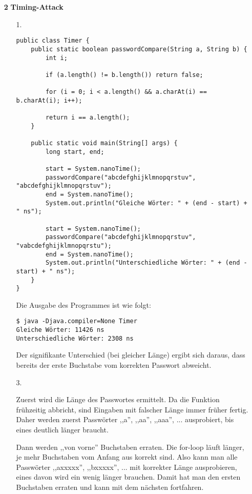 \documentclass[a4paper,11pt]{article}
\begin{document}
\begin{enumerate}
\item[\textbf{2}]
    \textbf{Timing-Attack}

    \begin{enumerate}
        \item[1.]
            \begin{verbatim}public class Timer {
    public static boolean passwordCompare(String a, String b) {
        int i;

        if (a.length() != b.length()) return false;

        for (i = 0; i < a.length() && a.charAt(i) == b.charAt(i); i++);

        return i == a.length();
    }

    public static void main(String[] args) {
        long start, end;

        start = System.nanoTime();
        passwordCompare("abcdefghijklmnopqrstuv", "abcdefghijklmnopqrstuv");
        end = System.nanoTime();
        System.out.println("Gleiche Wörter: " + (end - start) + " ns");

        start = System.nanoTime();
        passwordCompare("abcdefghijklmnopqrstuv", "vabcdefghijklmnopqrstu");
        end = System.nanoTime();
        System.out.println("Unterschiedliche Wörter: " + (end - start) + " ns");
    }
}\end{verbatim}

            Die Ausgabe des Programmes ist wie folgt:

            \begin{verbatim}$ java -Djava.compiler=None Timer
Gleiche Wörter: 11426 ns
Unterschiedliche Wörter: 2308 ns\end{verbatim}

            Der signifikante Unterschied (bei gleicher Länge) ergibt sich daraus,
            dass bereits der erste Buchstabe vom korrekten Passwort abweicht.

        \item[3.]

            Zuerst wird die Länge des Passwortes ermittelt. Da die Funktion frühzeitig abbricht, sind Eingaben mit falscher Länge immer früher fertig. Daher werden zuerst Passwörter ,,a'', ,,aa'', ,,aaa'', ... ausprobiert, bis eines deutlich länger braucht.

            Dann werden ,,von vorne'' Buchstaben erraten. Die for-loop läuft länger, je mehr Buchstaben vom Anfang aus korrekt sind. Also kann man alle Passwörter ,,axxxxx'', ,,bxxxxx'', ... mit korrekter Länge ausprobieren, eines davon wird ein wenig länger brauchen. Damit hat man den ersten Buchstaben erraten und kann mit dem nächsten fortfahren.

    \end{enumerate}

\end{enumerate}
\end{document}
